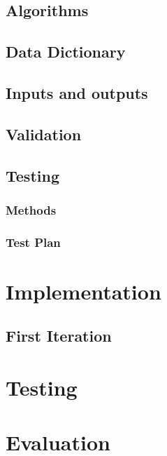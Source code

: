 \documentclass{article}
\begin{document}
\subsection{Algorithms}

\subsection{Data Dictionary}

\subsection{Inputs and outputs}

\subsection{Validation}

\subsection{Testing}

\subsubsection{Methods}

\subsubsection{Test Plan}

\section{Implementation}

\subsection{First Iteration}

\section{Testing}

\section{Evaluation}
\end{document}
